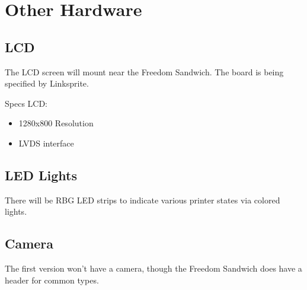 

\section{Other Hardware}

\subsection{LCD}
The LCD screen will mount near the Freedom Sandwich. The board is being specified by
Linksprite.

Specs LCD:

\begin{itemize}
  \item{1280x800 Resolution}
  \item{LVDS interface}
\end{itemize}


\subsection{LED Lights}
There will be RBG LED strips to indicate various printer states via colored
lights.

\subsection{Camera}
The first version won't have a camera, though the Freedom Sandwich does have a header for
common types.

